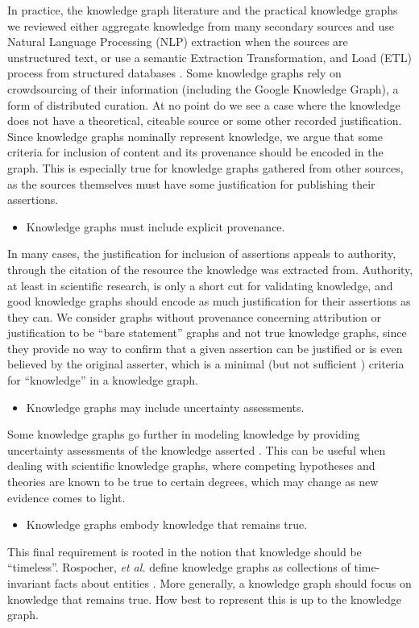 In practice, the knowledge graph literature and the practical knowledge graphs we reviewed either aggregate knowledge from many secondary sources and use Natural Language Processing (NLP) extraction when the sources are unstructured text, or use a semantic Extraction Transformation, and Load (ETL) process from structured databases \cite{McCusker_2009}.
Some knowledge graphs rely on crowdsourcing of their information (including the Google Knowledge Graph), a form of distributed curation.
At no point do we see a case where the knowledge does not have a theoretical, citeable source or some other recorded justification.
Since knowledge graphs nominally represent knowledge, we argue that some criteria for inclusion of content and its provenance should be encoded in the graph.
This is especially true for knowledge graphs gathered from other sources, as the sources themselves must have some justification for publishing their assertions.
\begin {itemize}
\item Knowledge graphs must include explicit provenance.
\end {itemize}
In many cases, the justification for inclusion of assertions appeals to authority, through the citation of the resource the knowledge was extracted from.
Authority, at least in scientific research, is only a short cut for validating knowledge, and good knowledge graphs should encode as much justification for their assertions as they can.
We consider graphs without provenance concerning attribution or justification to be ``bare statement'' graphs and not true knowledge graphs, since they provide no way to confirm that a given assertion can be justified or is even believed by the original asserter, which is a minimal (but not sufficient \cite{Gettier_1963}) criteria for ``knowledge'' in a knowledge graph.

\begin {itemize}
\item Knowledge graphs may include uncertainty assessments.
\end {itemize}

Some knowledge graphs go further in modeling knowledge by providing uncertainty assessments of the knowledge asserted \cite{Dong_2014}.
This can be useful when dealing with scientific knowledge graphs, where competing hypotheses and theories are known to be true to certain degrees, which may change as new evidence comes to light.
\begin {itemize}
\item Knowledge graphs embody knowledge that remains true.
\end {itemize}

This final requirement is rooted in the notion that knowledge should be ``timeless''.
Rospocher, \textit{et al.} define knowledge graphs as collections of time-invariant facts about entities \cite{Rospocher2016}.
More generally, a knowledge graph should focus on knowledge that remains true.
How best to represent this is up to the knowledge graph.